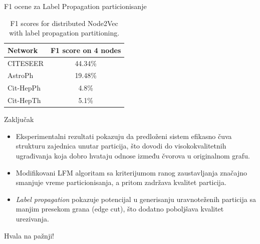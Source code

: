 \documentclass{beamer}
\begin{document}
\begin{frame}{F1 ocene za Label Propagation particionisanje}
\begin{table}[h]
\centering
\begin{tabular}{lc}
\hline
\textbf{Network} & \textbf{F1 score on 4 nodes} \\
\hline
CITESEER   & 44.34\% \\
AstroPh    & 19.48\% \\
Cit-HepPh  & 4.8\%   \\
Cit-HepTh  & 5.1\%   \\
\hline
\end{tabular}
\caption*{F1 scores for distributed Node2Vec with label propagation partitioning.}
\end{table}
\end{frame}

\begin{frame}{Zaključak}
\begin{itemize}
  \item Eksperimentalni rezultati pokazuju da predloženi sistem efikasno čuva strukturu zajednica unutar particija, što dovodi do visokokvalitetnih ugrađivanja koja dobro hvataju odnose između čvorova u originalnom grafu.
  \item Modifikovani LFM algoritam sa kriterijumom ranog zaustavljanja značajno smanjuje vreme particionisanja, a pritom zadržava kvalitet particija.
  \item \emph{Label propagation} pokazuje potencijal u generisanju uravnoteženih particija sa manjim presekom grana (edge cut), što dodatno poboljšava kvalitet urezivanja.
\end{itemize}
\end{frame}




\begin{frame}
	\begin{center}
		\Huge Hvala na pažnji!
	\end{center}
\end{frame}
\end{document}
